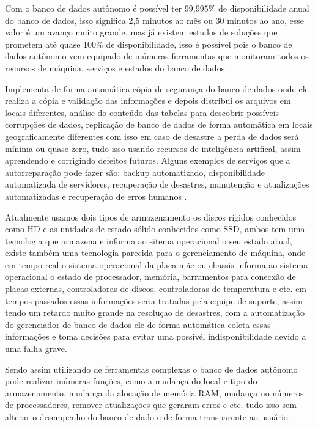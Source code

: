 \begin{alineas}
	Com o banco de dados autônomo é possível ter 99,995\% de disponibilidade anual do banco de dados, isso significa 2,5 minutos ao mês ou 30 minutos ao ano, esse valor é um avanço muito grande, mas já existem estudos de soluções que prometem até quase 100\% de disponibilidade, isso é possível pois o banco de dados autônomo vem equipado de inúmeras ferramentas que monitoram todos os recursos de máquina, serviços e estados do banco de dados.
	
	Implementa de forma automática cópia de segurança do banco de dados onde ele realiza a cópia e validação das informações e depois distribui os arquivos em locais diferentes, análise do conteúdo das tabelas para descobrir possíveis corrupções de dados, replicação de banco de dados de forma automática em locais geograficamente diferentes com isso em caso de desastre a perda de dados será mínima ou quase zero, tudo isso usando recursos de inteligência artifical, assim aprendendo e corrigindo defeitos futuros. Alguns exemplos de serviços que a autorreparação pode fazer são: backup automatizado, disponibilidade automatizada de servidores, recuperação de desastres, manutenção e atualizações automatizadas e recuperação de erros humanos \cite{OracleAut}.
	
	Atualmente usamos dois tipos de armazenamento os discos rígidos conhecidos como HD e as unidades de estado sólido conhecidos como SSD, ambos tem uma tecnologia que armazena e informa ao sitema operacional o seu estado atual, existe também uma tecnologia parecida para o gerenciamento de máquina, onde em tempo real o sistema operacional da placa mãe ou chassis informa ao sistema operacional o estado de processador, memória, barramentos para conecxão de placas externas, controladoras de discos, controladoras de temperatura e etc. em tempos passados essas informações seria tratadas pela equipe de suporte, assim tendo um retardo muito grande na resoluçao de desastres, com a automatização do gerenciador de banco de dados ele de forma automática coleta essas informações e toma decisões para evitar uma possivél indisponibilidade devido a uma falha grave.
	
	Sendo assim utilizando de ferramentas complexas o banco de dados autônomo pode realizar inúmeras funções, como a mudança do local e tipo do armazenamento, mudança da alocação de memória RAM, mudança no números de processadores, remover atualizações que geraram erros e etc. tudo isso sem alterar o desempenho do banco de dado e de forma transparente ao usuário.   
	  
\end{alineas}

